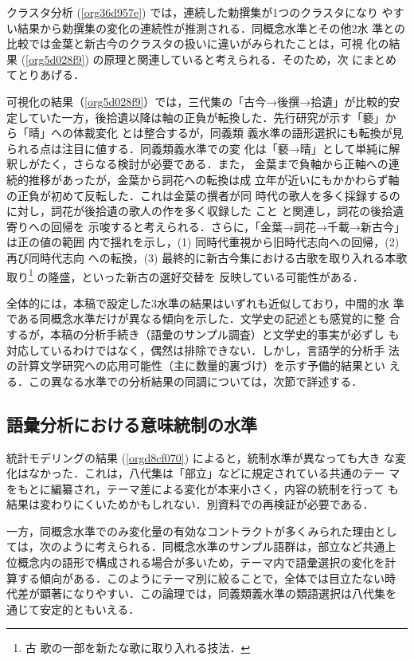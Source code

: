 \documentclass[submit]{ipsj}
\renewcommand{\ref}{\cref}
\begin{document}
クラスタ分析 (\ref{org36d957e}) では，連続した勅撰集が1つのクラスタになり
やすい結果から勅撰集の変化の連続性が推測される．同概念水準とその他2水
準との比較では金葉と新古今のクラスタの扱いに違いがみられたことは，可視
化の結果 (\ref{org5d028f9}) の原理と関連していると考えられる．そのため，次
にまとめてとりあげる．

可視化の結果（\ref{org5d028f9}）では，三代集の「古今→後撰→拾遺」が比較的安
定していた一方，後拾遺以降は軸の正負が転換した．先行研究が示す「褻」か
ら「晴」への体裁変化 \cite{ueno1976Koshui} とは整合するが，同義類
義水準の語形選択にも転換が見られる点は注目に値する．同義類義水準での変
化は「褻→晴」として単純に解釈しがたく，さらなる検討が必要である．また，
金葉まで負軸から正軸への連続的推移があったが，金葉から詞花への転換は成
立年が近いにもかかわらず軸の正負が初めて反転した．これは金葉の撰者が同
時代の歌人を多く採録するのに対し，詞花が後拾遺の歌人の作を多く収録した
こと \cite{matsuda1939Shika} と関連し，詞花の後拾遺寄りへの回帰を
示唆すると考えられる．さらに，「金葉→詞花→千載→新古今」は正の値の範囲
内で揺れを示し，(1) 同時代重視から旧時代志向への回帰，(2) 再び同時代志向
への転換，(3) 最終的に新古今集における古歌を取り入れる本歌取り\footnote{古
歌の一部を新たな歌に取り入れる技法．} の隆盛，といった新古の選好交替を
反映している可能性がある．

全体的には，本稿で設定した3水準の結果はいずれも近似しており，中間的水
準である同概念水準だけが異なる傾向を示した．文学史の記述とも感覚的に整
合するが，本稿の分析手続き（語彙のサンプル調査）と文学史的事実が必ずし
も対応しているわけではなく，偶然は排除できない．しかし，言語学的分析手
法の計算文学研究への応用可能性（主に数量的裏づけ）を示す予備的結果とい
える．この異なる水準での分析結果の同調については，次節で詳述する．
\subsection{語彙分析における意味統制の水準\label{orga1144b3}}
\label{sec:org9bfd36a}
統計モデリングの結果 (\ref{orgd8cf070}) によると，統制水準が異なっても大き
な変化はなかった．これは，八代集は「部立」などに規定されている共通のテー
マをもとに編纂され，テーマ差による変化が本来小さく，内容の統制を行って
も結果は変わりにくいためかもしれない．別資料での再検証が必要である．

一方，同概念水準でのみ変化量の有効なコントラクトが多くみられた理由とし
ては，次のように考えられる．同概念水準のサンプル語群は，部立など共通上
位概念内の語形で構成される場合が多いため，テーマ内で語彙選択の変化を計
算する傾向がある．このようにテーマ別に絞ることで，全体では目立たない時
代差が顕著になりやすい．この論理では，同義類義水準の類語選択は八代集を
通じて安定的ともいえる．
\end{document}
